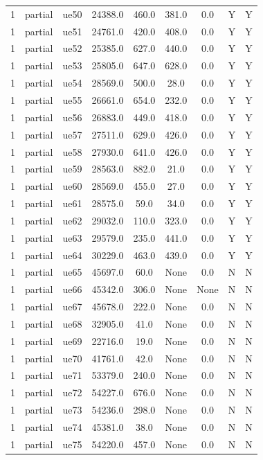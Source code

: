 \begin{table}[ht]
\begin{tabular}{|c|c|c|c|c|c|c|c|c|}
1 & partial & ue50 & 24388.0 & 460.0 & 381.0 & 0.0 & Y & Y \\
1 & partial & ue51 & 24761.0 & 420.0 & 408.0 & 0.0 & Y & Y \\
1 & partial & ue52 & 25385.0 & 627.0 & 440.0 & 0.0 & Y & Y \\
1 & partial & ue53 & 25805.0 & 647.0 & 628.0 & 0.0 & Y & Y \\
1 & partial & ue54 & 28569.0 & 500.0 & 28.0 & 0.0 & Y & Y \\
1 & partial & ue55 & 26661.0 & 654.0 & 232.0 & 0.0 & Y & Y \\
1 & partial & ue56 & 26883.0 & 449.0 & 418.0 & 0.0 & Y & Y \\
1 & partial & ue57 & 27511.0 & 629.0 & 426.0 & 0.0 & Y & Y \\
1 & partial & ue58 & 27930.0 & 641.0 & 426.0 & 0.0 & Y & Y \\
1 & partial & ue59 & 28563.0 & 882.0 & 21.0 & 0.0 & Y & Y \\
1 & partial & ue60 & 28569.0 & 455.0 & 27.0 & 0.0 & Y & Y \\
1 & partial & ue61 & 28575.0 & 59.0 & 34.0 & 0.0 & Y & Y \\
1 & partial & ue62 & 29032.0 & 110.0 & 323.0 & 0.0 & Y & Y \\
1 & partial & ue63 & 29579.0 & 235.0 & 441.0 & 0.0 & Y & Y \\
1 & partial & ue64 & 30229.0 & 463.0 & 439.0 & 0.0 & Y & Y \\
1 & partial & ue65 & 45697.0 & 60.0 & None & 0.0 & N & N \\
1 & partial & ue66 & 45342.0 & 306.0 & None & None & N & N \\
1 & partial & ue67 & 45678.0 & 222.0 & None & 0.0 & N & N \\
1 & partial & ue68 & 32905.0 & 41.0 & None & 0.0 & N & N \\
1 & partial & ue69 & 22716.0 & 19.0 & None & 0.0 & N & N \\
1 & partial & ue70 & 41761.0 & 42.0 & None & 0.0 & N & N \\
1 & partial & ue71 & 53379.0 & 240.0 & None & 0.0 & N & N \\
1 & partial & ue72 & 54227.0 & 676.0 & None & 0.0 & N & N \\
1 & partial & ue73 & 54236.0 & 298.0 & None & 0.0 & N & N \\
1 & partial & ue74 & 45381.0 & 38.0 & None & 0.0 & N & N \\
1 & partial & ue75 & 54220.0 & 457.0 & None & 0.0 & N & N \\

\end{tabular}
\end{table}
